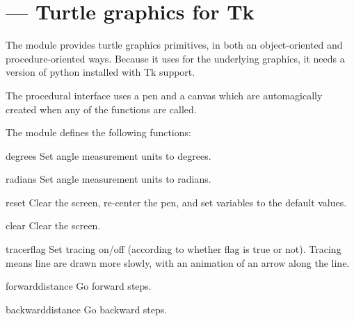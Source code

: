 \section{ ---
         Turtle graphics for Tk}




The  module provides turtle graphics primitives, in both an
object-oriented and procedure-oriented ways. Because it uses 
for the underlying graphics, it needs a version of python installed with
Tk support.

The procedural interface uses a pen and a canvas which are automagically
created when any of the functions are called.

The  module defines the following functions:

\begin{funcdesc}{degrees}{}
Set angle measurement units to degrees.
\end{funcdesc}

\begin{funcdesc}{radians}{}
Set angle measurement units to radians.
\end{funcdesc}

\begin{funcdesc}{reset}{}
Clear the screen, re-center the pen, and set variables to the default
values.
\end{funcdesc}

\begin{funcdesc}{clear}{}
Clear the screen.
\end{funcdesc}

\begin{funcdesc}{tracer}{flag}
Set tracing on/off (according to whether flag is true or not). Tracing
means line are drawn more slowly, with an animation of an arrow along the 
line.
\end{funcdesc}

\begin{funcdesc}{forward}{distance}
Go forward  steps.
\end{funcdesc}

\begin{funcdesc}{backward}{distance}
Go backward  steps.
\end{funcdesc}

